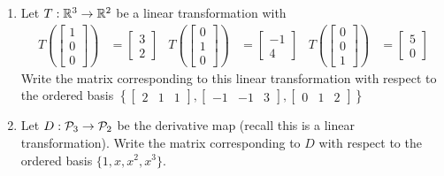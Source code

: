 \documentclass{article}
\begin{document}
\begin{app}
\begin{enumerate}[1)]
\item Let $T: \IR^3 \rightarrow \IR^2$ be a linear transformation with
\begin{align*}
T\left(\begin{bmatrix} 1 \\ 0 \\ 0 \end{bmatrix} \right) &= \begin{bmatrix} 3 \\ 2\end{bmatrix} &
T\left(\begin{bmatrix} 0 \\ 1 \\ 0 \end{bmatrix} \right) &= \begin{bmatrix} -1 \\ 4\end{bmatrix} &
T\left(\begin{bmatrix} 0 \\ 0 \\ 1 \end{bmatrix} \right) &= \begin{bmatrix} 5 \\ 0\end{bmatrix}
\end{align*}
Write the matrix corresponding to this linear transformation with respect to the ordered basis $\left\{ \begin{bmatrix} 2 & 1 & 1 \end{bmatrix} , \begin{bmatrix} -1 & -1 & 3 \end{bmatrix} , \begin{bmatrix} 0 & 1 & 2 \end{bmatrix} \right\}$

\item Let $D: \P_3 \rightarrow \P_2$ be the derivative map (recall this is a linear transformation).  Write the matrix corresponding to $D$ with respect to the ordered basis $\{1,x,x^2,x^3\}$.

\end{enumerate}
\end{app}
\end{document}
